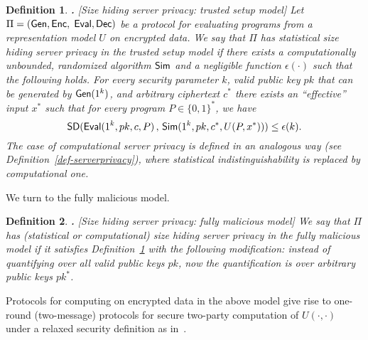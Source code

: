 \documentclass{article}
\newcommand{\SD}{{\sf SD }}
\renewcommand{\sim}{{\sf Sim}}
\newcommand{\fnrngdom}[2]{#1\to#2}
\newcommand{\fndef}[3]{{#1\,:\,\fnrngdom{#2}{#3}}}
\newcommand{\set}[1]{\left\{#1\right\}}
\newtheorem{DEFINITION}{Definition}[section]
\newenvironment{definition}{\begin{DEFINITION} \hspace{-.85em} {\bf .} \rm}%
	{\end{DEFINITION}}
\newcommand{\bools}[1][]{{\set{0,1}}^{#1}}
\newcommand{\gen}{{\sf Gen}}
\newcommand{\enc}{{\sf Enc}}
\newcommand{\eval}{{\sf Eval}}
\newcommand{\dec}{{\sf Dec}}
\newcommand{\eps}{{\epsilon}}
\begin{document}
\begin{definition}[Size hiding server privacy: trusted setup model]
\label{def-trustedsetup} Let $\Pi=(\gen,\enc,$ $\eval,\dec)$ be a
protocol for evaluating programs from a representation model
$U$ on encrypted data. We say that $\Pi$ has {\em statistical size
hiding server privacy in the trusted setup model} if there exists a
computationally unbounded, randomized algorithm $\sim$ and a
negligible function $\eps(\cdot)$ such that the following holds.
For every security parameter $k$, valid public key $pk$ that can be
generated by $\gen(1^k)$, and arbitrary ciphertext $c^*$ there
exists an ``effective'' input $x^*$ such that for every program
$P\in\{0,1\}^*$, we have
\[ \SD(\eval(1^k,pk,c,P)\,,\,\sim(1^k,
pk, c^*, U(P,x^*))) \le \epsilon(k). \]
The case of {\em  computational} server privacy is defined in an
analogous way (see Definition~\ref{def-serverprivacy}),
where statistical indistinguishability is
replaced by computational one.
\end{definition}
We turn to the fully malicious model.
\begin{definition}[Size hiding server privacy: fully malicious model]
\label{def-fullymalicious} We say that $\Pi$ has (statistical or
computational) {\em size hiding server privacy in the fully
malicious model} if it satisfies Definition~\ref{def-trustedsetup}
with the following modification: instead of quantifying over all
{\em valid} public keys $pk$, now the quantification is over
arbitrary public keys $pk^*$.
\end{definition}

Protocols for computing on encrypted data in the above model give
rise to one-round (two-message) protocols for secure two-party
computation of $U(\cdot,\cdot)$ under a relaxed security definition
as in~\cite{NP01,AIR01,FIPR05}.

\end{document}
